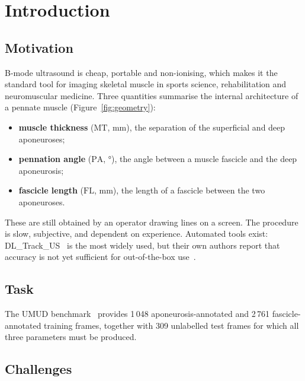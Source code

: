 \documentclass[11pt,a4paper]{article}
\newcommand{\MT}{\ensuremath{\mathrm{MT}}}
\newcommand{\PA}{\ensuremath{\mathrm{PA}}}
\newcommand{\FL}{\ensuremath{\mathrm{FL}}}
\newcommand{\degs}{\si{\degree}}
\begin{document}
\tableofcontents
\newpage

\section{Introduction}

\subsection{Motivation}

B-mode ultrasound is cheap, portable and non-ionising, which makes it the
standard tool for imaging skeletal muscle in sports science, rehabilitation and
neuromuscular medicine. Three quantities summarise the internal architecture of
a pennate muscle (Figure~\ref{fig:geometry}):

\begin{itemize}
  \item \textbf{muscle thickness} (\MT, \si{\milli\metre}), the separation of
        the superficial and deep aponeuroses;
  \item \textbf{pennation angle} (\PA, \degs), the angle between a muscle
        fascicle and the deep aponeurosis;
  \item \textbf{fascicle length} (\FL, \si{\milli\metre}), the length of a
        fascicle between the two aponeuroses.
\end{itemize}

These are still obtained by an operator drawing lines on a screen. The procedure
is slow, subjective, and dependent on experience. Automated tools exist:
DL\_Track\_US~\citep{ritsche2024dltrack} is the most widely used, but their
own authors report that accuracy is not yet sufficient for out-of-the-box
use~\citep{ritsche2026umud}.

\subsection{Task}

The UMUD benchmark~\citep{umudchallenge2026} provides 1\,048 aponeurosis-annotated
and 2\,761 fascicle-annotated training frames, together with 309 unlabelled test
frames for which all three parameters must be produced.

\subsection{Challenges}
\end{document}
